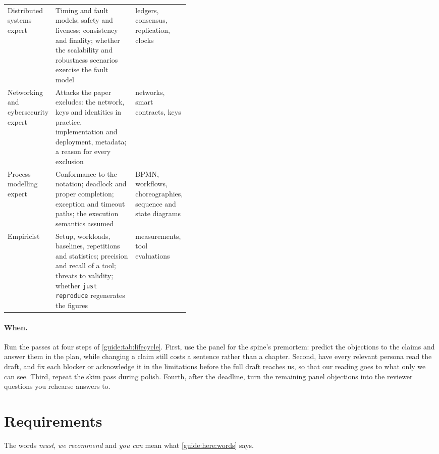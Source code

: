 {\begin{xltabular}{\linewidth}{>{\raggedright\arraybackslash}p{0.2\linewidth} X >{\raggedright\arraybackslash}p{0.22\linewidth}}
  Distributed systems expert & Timing and fault models; safety and liveness; consistency and finality; whether the scalability and robustness scenarios exercise the fault model & ledgers, consensus, replication, clocks \\
  Networking and cybersecurity expert & Attacks the paper excludes: the network, keys and identities in practice, implementation and deployment, metadata; a reason for every exclusion & networks, smart contracts, keys \\
  Process modelling expert & Conformance to the notation; deadlock and proper completion; exception and timeout paths; the execution semantics assumed & BPMN, workflows, choreographies, sequence and state diagrams \\
  Empiricist & Setup, workloads, baselines, repetitions and statistics; precision and recall of a tool; threats to validity; whether \texttt{just reproduce} regenerates the figures & measurements, tool evaluations \\
\end{xltabular}
}

\paragraph{When.}\label{guide:lifecycle:when-passes} Run the passes at four steps of \cref{guide:tab:lifecycle}. First, use the panel for the spine's premortem: predict the objections to the claims and answer them in the plan, while changing a claim still costs a sentence rather than a chapter. Second, have every relevant persona read the draft, and fix each blocker or acknowledge it in the limitations before the full draft reaches us, so that our reading goes to what only we can see. Third, repeat the skim pass during polish. Fourth, after the deadline, turn the remaining panel objections into the reviewer questions you rehearse answers to.

\section{Requirements}\label{guide:lifecycle:polish}
The words \emph{must}, \emph{we recommend} and \emph{you can} mean what \cref{guide:here:words} says.

